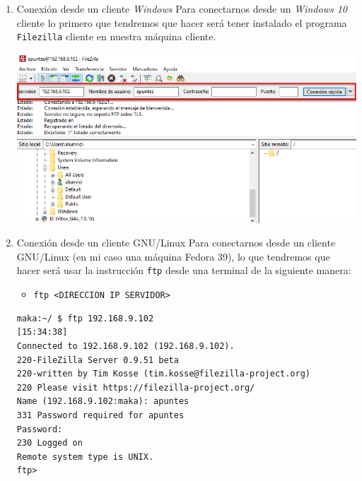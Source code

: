 \documentclass[11pt]{article}
\begin{document}
\begin{enumerate}
\item Conexión desde un cliente \emph{Windows}
\label{sec:org908f80f}
Para conectarnos desde un \emph{Windows 10} cliente lo primero que tendremos que hacer será tener instalado el programa \texttt{Filezilla} cliente en nuestra máquina cliente.

\begin{center}
\includegraphics[width=.9\linewidth]{./media/5.png}
\end{center}

\item Conexión desde un cliente GNU/Linux
\label{sec:org5d05857}
Para conectarnos desde un cliente GNU/Linux (en mi caso una máquina Fedora 39), lo que tendremos que hacer será usar la instrucción \texttt{ftp} desde una terminal de la siguiente manera:
\begin{itemize}
\item \texttt{ftp <DIRECCION IP SERVIDOR>}
\end{itemize}

\begin{verbatim}
maka:~/ $ ftp 192.168.9.102                                                                                [15:34:38]
Connected to 192.168.9.102 (192.168.9.102).
220-FileZilla Server 0.9.51 beta
220-written by Tim Kosse (tim.kosse@filezilla-project.org)
220 Please visit https://filezilla-project.org/
Name (192.168.9.102:maka): apuntes
331 Password required for apuntes
Password:
230 Logged on
Remote system type is UNIX.
ftp> 
\end{verbatim}
\end{enumerate}
\end{document}
